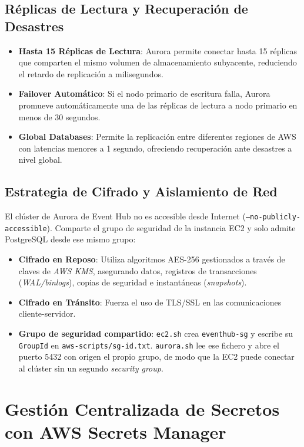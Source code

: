 \documentclass[12pt,a4paper]{article}
\begin{document}
\subsection{Réplicas de Lectura y Recuperación de Desastres}
\begin{itemize}
    \item \textbf{Hasta 15 Réplicas de Lectura}: Aurora permite conectar hasta 15 réplicas que comparten el mismo volumen de almacenamiento subyacente, reduciendo el retardo de replicación a milisegundos.
    \item \textbf{Failover Automático}: Si el nodo primario de escritura falla, Aurora promueve automáticamente una de las réplicas de lectura a nodo primario en menos de 30 segundos.
    \item \textbf{Global Databases}: Permite la replicación entre diferentes regiones de AWS con latencias menores a 1 segundo, ofreciendo recuperación ante desastres a nivel global.
\end{itemize}

\subsection{Estrategia de Cifrado y Aislamiento de Red}
El clúster de Aurora de Event Hub no es accesible desde Internet (\texttt{--no-publicly-accessible}). Comparte el grupo de seguridad de la instancia EC2 y solo admite PostgreSQL desde ese mismo grupo:
\begin{itemize}
    \item \textbf{Cifrado en Reposo}: Utiliza algoritmos AES-256 gestionados a través de claves de \textit{AWS KMS}, asegurando datos, registros de transacciones (\textit{WAL/binlogs}), copias de seguridad e instantáneas (\textit{snapshots}).
    \item \textbf{Cifrado en Tránsito}: Fuerza el uso de TLS/SSL en las comunicaciones cliente-servidor.
    \item \textbf{Grupo de seguridad compartido}: \texttt{ec2.sh} crea \texttt{eventhub-sg} y escribe su \texttt{GroupId} en \texttt{aws-scripts/sg-id.txt}. \texttt{aurora.sh} lee ese fichero y abre el puerto 5432 con origen el propio grupo, de modo que la EC2 puede conectar al clúster sin un segundo \textit{security group}.
\end{itemize}

\section{Gestión Centralizada de Secretos con AWS Secrets Manager}
\end{document}
